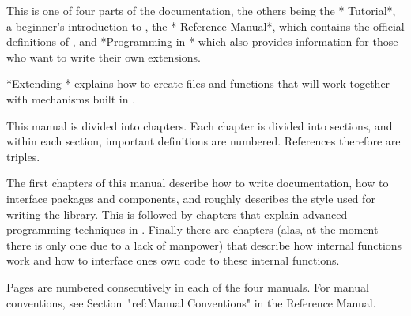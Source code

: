 
This is one of four parts of the {\GAP} documentation,
the others being
the *{\GAP} Tutorial*, a beginner's introduction to {\GAP},
the *{\GAP} Reference Manual*,
which contains the official definitions of {\GAP},
and *Programming in {\GAP}*
which also provides information for those who want to write their own
{\GAP} extensions.

*Extending {\GAP}* explains how to create files and functions that will work
together with mechanisms built in {\GAP}.

This manual is divided into chapters.
Each chapter is divided into sections,
and within each section, important definitions are numbered.
References therefore are triples.

The first chapters of this manual describe how to write documentation,
how to interface packages and components,
and roughly describes the style used for writing the library.
This is followed by chapters that explain advanced programming techniques in
{\GAP}.
Finally there are chapters (alas, at the moment there is only one due to a
lack of manpower) that describe how internal functions work and how to
interface ones own code to these internal functions.

Pages are numbered consecutively in each of the four manuals.
For manual conventions, see Section~"ref:Manual Conventions"
in the Reference Manual.



